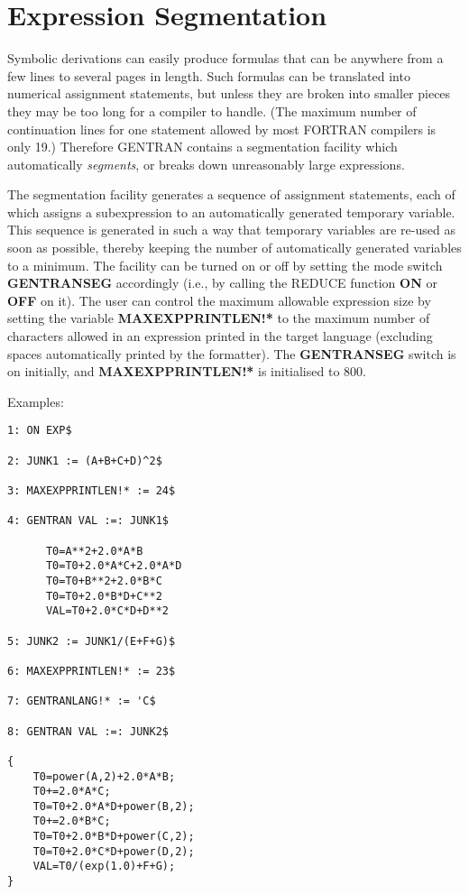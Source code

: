 \section{Expression Segmentation}
\label{segmentation}
Symbolic derivations can easily produce formulas that can be anywhere
from a few lines to several pages in length.  Such formulas
can be translated into numerical assignment statements, but unless they
are broken into smaller pieces they may be too long for a compiler
to handle.  (The maximum number of continuation lines for one statement
allowed by most FORTRAN compilers is only 19.)  Therefore GENTRAN
contains a segmentation facility which
automatically {\it segments}, or breaks down unreasonably large expressions.

The segmentation facility generates a sequence of assignment
statements, each of which assigns a subexpression to an
automatically generated temporary variable.  This sequence is
generated in such a way that temporary variables are re-used as soon
as possible, thereby keeping the number of automatically generated
variables to a minimum.  The
facility can be turned on or off by setting the mode
switch {\bf GENTRANSEG} accordingly (i.e., by calling the REDUCE function
{\bf ON} or {\bf OFF} on it).  The user can control the maximum allowable
expression size by setting the variable {\bf MAXEXPPRINTLEN!*}
to the maximum number of characters allowed in an expression printed in the
target language (excluding spaces automatically printed by the
formatter).  The {\bf GENTRANSEG} switch is on initially, and
{\bf MAXEXPPRINTLEN!*} is initialised to 800.
\begin{describe}{Examples:}
\begin{verbatim}
1: ON EXP$ 

2: JUNK1 := (A+B+C+D)^2$ 

3: MAXEXPPRINTLEN!* := 24$ 

4: GENTRAN VAL :=: JUNK1$ 

      T0=A**2+2.0*A*B
      T0=T0+2.0*A*C+2.0*A*D
      T0=T0+B**2+2.0*B*C
      T0=T0+2.0*B*D+C**2
      VAL=T0+2.0*C*D+D**2

5: JUNK2 := JUNK1/(E+F+G)$ 

6: MAXEXPPRINTLEN!* := 23$ 

7: GENTRANLANG!* := 'C$ 

8: GENTRAN VAL :=: JUNK2$ 

{
    T0=power(A,2)+2.0*A*B;
    T0+=2.0*A*C;
    T0=T0+2.0*A*D+power(B,2);
    T0+=2.0*B*C;
    T0=T0+2.0*B*D+power(C,2);
    T0=T0+2.0*C*D+power(D,2);
    VAL=T0/(exp(1.0)+F+G);
}
\end{verbatim}
\end{describe}
